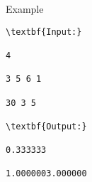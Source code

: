 Example
\begin{verbatim}
\textbf{Input:}

4

3 5 6 1

30 3 5

\textbf{Output:}

0.333333

1.0000003.000000\end{verbatim}